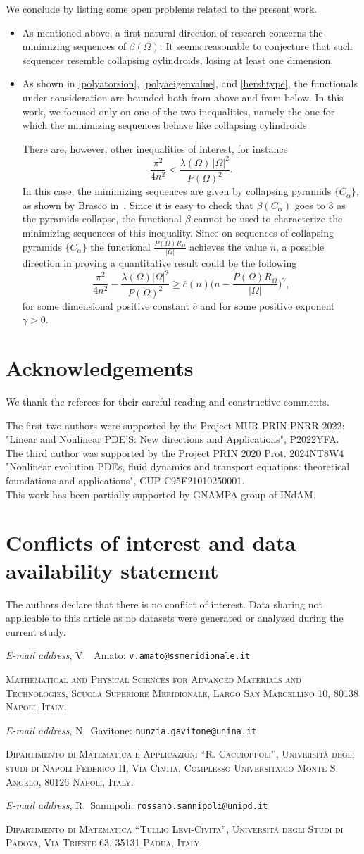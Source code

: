 \documentclass[oneside,a4paper,11pt,notitlepage]{article}
\makeatletter
\newcommand{\abs}[1]{{\left|#1\right|}}
\theoremstyle{definition}
\theoremstyle{plain}
\theoremstyle{definition}
\newcommand{\Addresses}{{%
  \bigskip 
   \footnotesize 
 \noindent \textit{E-mail address}, V.~ Amato: \texttt{v.amato@ssmeridionale.it} 
  
   \medskip 
 
  \noindent\textsc{Mathematical and Physical Sciences for Advanced Materials and Technologies, Scuola Superiore Meridionale, Largo San Marcellino 10, 80138 Napoli, Italy. } 
 
 
 \medskip 
 

   \textit{E-mail address}, N.~Gavitone: \texttt{nunzia.gavitone@unina.it} 
   
 \medskip
  \textsc{Dipartimento di Matematica e Applicazioni ``R. Caccioppoli'', Universit\`a degli studi di Napoli Federico II, Via Cintia, Complesso Universitario Monte S. Angelo, 80126 Napoli, Italy.}
  \medskip
 
  \textit{E-mail address}, R.~Sannipoli: \texttt{rossano.sannipoli@unipd.it} 
  
     \medskip 
\textsc{Dipartimento di Matematica “Tullio Levi-Civita”, Universit\'a degli Studi di Padova, Via Trieste 63, 35131 Padua, Italy.}\par\nopagebreak 

}}
\makeatother
\begin{document}
We conclude by listing some open problems related to the present work.
\begin{itemize}
    \item As mentioned above, a first natural direction of research concerns the minimizing sequences of $\beta(\Omega)$. It seems reasonable to conjecture that such sequences resemble collapsing cylindroids, losing at least one dimension.
    
    \item As shown in \eqref{polyatorsion}, \eqref{polyaeigenvalue}, and \eqref{hershtype}, the functionals under consideration are bounded both from above and from below. In this work, we focused only on one of the two inequalities, namely the one for which the minimizing sequences behave like collapsing cylindroids.
    
    There are, however, other inequalities of interest, for instance
    \[
    \frac{\pi^2}{4n^2}
    < \frac{\lambda(\Omega)\,|\Omega|^2}{P(\Omega)^2}.
    \]
    In this case, the minimizing sequences are given by collapsing pyramids $\{C_\alpha \}$, as shown by Brasco in~\cite{brasco2018principal}. Since it is easy to check that $\beta(C_\alpha) $ goes to $ 3$ as the pyramids collapse, the functional $\beta$ cannot be used to characterize the minimizing sequences of this inequality. Since on sequences of collapsing pyramids $\{C_\alpha\}$ the functional $\frac{P(\Omega)R_\Omega}{\abs{\Omega}}$ achieves the value $n$, a possible direction in proving a quantitative result could be the following
    \begin{equation*}
        \frac{\pi^2}{4n^2}-\frac{\lambda(\Omega)\abs{\Omega}^2}{P(\Omega)^2}\ge \overline{c}(n) \bigg(n-\frac{P(\Omega)R_\Omega}{\abs{\Omega}}\bigg)^\gamma,
    \end{equation*}
    for some dimensional positive constant $\overline{c}$ and for some positive exponent $\gamma>0$.
\end{itemize}

\section*{Acknowledgements}
We thank the referees for their careful reading and constructive comments.

The first two authors were supported by the Project MUR PRIN-PNRR 2022:  "Linear and Nonlinear PDE’S: New directions and Applications", P2022YFA.\\
The third author was supported by the Project PRIN 2020 Prot. 2024NT8W4 "Nonlinear evolution PDEs, fluid dynamics and transport equations: theoretical foundations and applications", CUP C95F21010250001.\\
This work has been partially supported by GNAMPA group of INdAM. 


\section*{Conflicts of interest and data availability statement}
The authors declare that there is no conflict of interest. Data sharing not applicable to this article as no datasets were generated or analyzed during the current study.






\Addresses 
\end{document}
